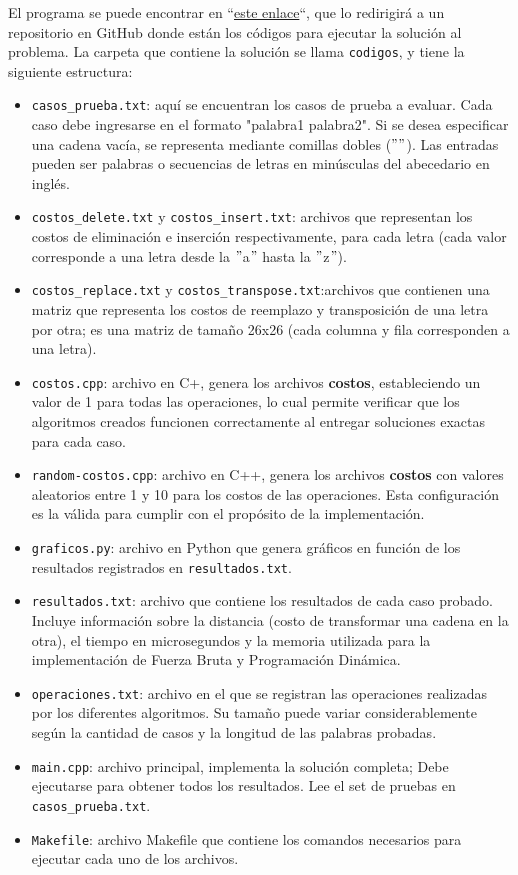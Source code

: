 El programa se puede encontrar en ``\href{https://github.com/luphin/Tarea2y3Algoritmos-FB-PD/tree/main}{este enlace}``, que lo redirigirá a un repositorio en GitHub donde están los códigos para ejecutar la solución al problema.
La carpeta que contiene la solución se llama \texttt{codigos}, y tiene la siguiente estructura:

\begin{itemize}
    \item \verb|casos_prueba.txt|: aquí se encuentran los casos de prueba a evaluar. Cada caso debe ingresarse en el formato "palabra1 palabra2". Si se desea especificar una cadena vacía, se representa mediante comillas dobles ($""$). Las entradas pueden ser palabras o secuencias de letras en minúsculas del abecedario en inglés. 
    \item \verb|costos_delete.txt| y \verb|costos_insert.txt|: archivos que representan los costos de eliminación e inserción respectivamente, para cada letra (cada valor corresponde a una letra desde la $"$a$"$ hasta la $"$z$"$).
    \item \verb|costos_replace.txt| y \verb|costos_transpose.txt|:archivos que contienen una matriz que representa los costos de reemplazo y transposición de una letra por otra; es una matriz de tamaño 26x26 (cada columna y fila corresponden a una letra).
    \item \verb|costos.cpp|: archivo en C+, genera los archivos \textbf{costos}, estableciendo un valor de 1 para todas las operaciones, lo cual permite verificar que los algoritmos creados funcionen correctamente al entregar soluciones exactas para cada caso.
    \item \verb|random-costos.cpp|: archivo en C++, genera los archivos \textbf{costos} con valores aleatorios entre 1 y 10 para los costos de las operaciones. Esta configuración es la válida para cumplir con el propósito de la implementación.
    \item \verb|graficos.py|: archivo en Python que genera gráficos en función de los resultados registrados en \verb|resultados.txt|.
    \item \verb|resultados.txt|: archivo que contiene los resultados de cada caso probado. Incluye información sobre la distancia (costo de transformar una cadena en la otra), el tiempo en microsegundos y la memoria utilizada para la implementación de Fuerza Bruta y Programación Dinámica.
    \item \verb|operaciones.txt|: archivo en el que se registran las operaciones realizadas por los diferentes algoritmos. Su tamaño puede variar considerablemente según la cantidad de casos y la longitud de las palabras probadas.
    \item \verb|main.cpp|: archivo principal, implementa la solución completa; Debe ejecutarse para obtener todos los resultados. Lee el set de pruebas en \verb|casos_prueba.txt|.
    \item \verb|Makefile|: archivo Makefile que contiene los comandos necesarios para ejecutar cada uno de los archivos.
\end{itemize}



